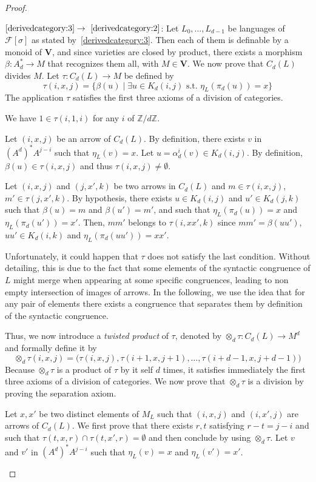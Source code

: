 \documentclass[submission,hidelink]{dmtcs-episciences}
\newcommand{\WF}{K}
\newcommand{\Z}{{\mathbb Z}}     \newcommand{\N}{{\mathbb N}}
\newcommand{\V}{\mathbf{V}}
\newcommand{\cF}{\mathcal{F}}
\newcommand{\Ae}{A_d}
\newenvironment{conditions}
{\begin{list}{\rm (\theenumi)}{\noindent \usecounter{enumi}\setlength{\topsep}{2pt}\setlength{\partopsep}{0pt}\setlength{\itemsep}{2pt}\setlength{\parsep}{0pt}\setlength{\leftmargin}{2.5em}\setlength{\labelwidth}{1.5em}\setlength{\labelsep}{0.5em}\setlength{\listparindent}{0pt}\setlength{\itemindent}{0pt}}}{\end{list}}
\begin{document}
\begin{proof}
\begin{conditions}
				\item[$\eqref{derivedcategory:3}\to~\eqref{derivedcategory:2}$:]
					Let $L_0,\ldots, L_{d-1}$ be languages of $\cF[\sigma]$ as stated by~\eqref{derivedcategory:3}.
					Then each of them is definable by a monoid of $\V$, and since varieties are closed by product, there exists a morphism $\beta:\Ae^*\to M$ that recognizes them all, with $M\in \V$.
					We now prove that $C_d(L)$ divides $M$.
					Let $\tau:C_d(L)\to M$  be defined by
					$$\tau(i,x,j) = \{ \beta(u)\mid \exists u\in \WF_d(i,j) \text{ s.t. } \eta_L(\pi_d(u)) = x\}$$
					The application $\tau$ satisfies the first three axioms of a division of categories.
					\begin{conditions}
						\item We have $1\in\tau(i,1,i)$ for any $i$ of $\Z/d\Z$.
						\item Let $(i,x,j)$ be an arrow of $C_d(L)$.
						By definition, there exists $v$ in $(A^d)^*A^{j-i}$ such that $\eta_L(v) = x$.
						Let $u=\alpha_d^i(v)\in \WF_d(i,j)$. By definition, $\beta(u)\in \tau(i,x,j)$ and thus
						$\tau(i,x,j)\neq \emptyset$.
						\item Let $(i,x,j)$ and $(j,x',k)$ be two arrows in $C_d(L)$ and
						$m\in\tau(i,x,j)$, $m'\in \tau(j,x',k)$. By hypothesis, there exists $u\in \WF_d(i,j)$ and
						$u'\in \WF_d(j,k)$ such that
						$\beta(u)=m$ and $\beta(u')= m'$, and such that $\eta_L(\pi_d(u)) = x$ and
						$\eta_L(\pi_d(u')) = x'$. Then, $mm'$ belongs to $\tau(i,xx',k)$ since
						$mm'= \beta(uu')$, $uu'\in \WF_d(i,k)$ and $\eta_L(\pi_d(uu')) = xx'$.
					\end{conditions}
					Unfortunately, it could happen that $\tau$ does not satisfy the last condition.
					Without detailing, this is due to the fact that
					some elements of the syntactic congruence of $L$ might merge when appearing at some specific congruences, leading to non empty intersection of images of arrows.
					In the following, we use the idea that for any pair of elements there exists a congruence that separates them by definition of the syntactic congruence.

					Thus, we now introduce a \emph{twisted product} of $\tau$, denoted by $\otimes_d\tau:C_d(L)\to M^d$
					and formally define it by
					$$\otimes_d\tau(i,x,j) = \big(\tau(i,x,j),\tau(i+1,x,j+1),\ldots,\tau(i+d-1,x,j+d-1)\big)$$
					Because $\otimes_d\tau$ is a product of $\tau$ by it self $d$ times, it satisfies immediately the
					first
					three axioms of a division of categories. We now prove that $\otimes_d\tau$ is a division by proving the separation axiom.
					\begin{conditions}
						\setcounter{enumi}{3}
						\item Let $x,x'$ be two distinct elements of $M_L$ such that
						$(i,x,j)$ and $(i,x',j)$ are arrows of $C_d(L)$. We first
						prove that there exists $r,t$ satisfying $r-t=j-i$
						and such that $\tau(t,x,r)\cap \tau(t,x',r) = \emptyset$
						and then conclude by using $\otimes_d\tau$.
						Let $v$ and $v'$ in $(A^d)^*A^{j-i}$ such that $\eta_L(v) = x$ and $\eta_L(v') = x'$.


\end{conditions}
\end{conditions}
\end{proof}
\end{document}

